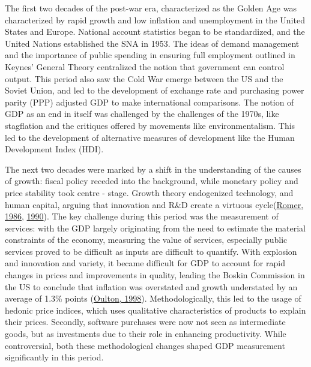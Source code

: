 \documentclass[12pt,nobind, a4paper]{reedthesis}
\begin{document}
 The first two decades of the post-war era, characterized as the Golden Age was characterized by rapid growth and low inflation and unemployment in the United States and Europe. National account statistics began to be standardized, and the United Nations established the SNA in 1953. The ideas of demand management and the importance of public spending in ensuring full employment outlined in Keynes' General Theory centralized the notion that government can control output. This period also saw the Cold War emerge between the US and the Soviet Union, and led to the development of exchange rate and purchasing power parity (PPP) adjusted GDP to make international comparisons. The notion of GDP as an end in itself was challenged by the challenges of the 1970s, like stagflation and the critiques offered by movements like environmentalism. This led to the development of alternative measures of development like the Human Development Index (HDI).
 \linebreak

 The next two decades were marked by a shift in the understanding of the causes of growth: fiscal policy receded into the background, while monetary policy and price stability took centre - stage. Growth theory endogenized technology, and human capital, arguing that innovation and R\&D create a virtuous cycle(\protect\hyperlink{ref-romer_increasing_1986}{Romer, 1986}, \protect\hyperlink{ref-romer_endogenous_1990}{1990}). The key challenge during this period was the measurement of services: with the GDP largely originating from the need to estimate the material constraints of the economy, measuring the value of services, especially public services proved to be difficult as inputs are difficult to quantify. With explosion and innovation and variety, it became difficult for GDP to account for rapid changes in prices and improvements in quality, leading the Boskin Commission in the US to conclude that inflation was overstated and growth understated by an average of 1.3\% points (\protect\hyperlink{ref-oulton_implications_1998}{Oulton, 1998}). Methodologically, this led to the usage of hedonic price indices, which uses qualitative characteristics of products to explain their prices. Secondly, software purchases were now not seen as intermediate goods, but as investments due to their role in enhancing productivity. While controversial, both these methodological changes shaped GDP measurement significantly in this period.
 \linebreak
\end{document}

